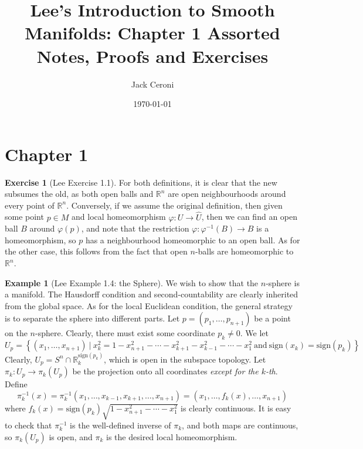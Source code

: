 \documentclass[aps,pra,showpacs,notitlepage,onecolumn,superscriptaddress,nofootinbib]{revtex4-1}
\theoremstyle{definition}
\newtheorem{example}{Example}[section]
\newtheorem{exercise}{Exercise}[section]
\begin{document}
\title{Lee's Introduction to Smooth Manifolds: Chapter 1 Assorted Notes, Proofs and Exercises}

\author{Jack Ceroni}

\date{\today}

\maketitle


\section{Chapter 1}

\begin{exercise}[Lee Exercise 1.1]
  For both definitions, it is clear that the new subsumes the old, as both open balls and $\mathbb{R}^{n}$ are open neighbourhoods around every point of $\mathbb{R}^{n}$.
Conversely, if we assume the original definition, then given some point $p \in M$ and local homeomorphism $\varphi : U \rightarrow \widehat{U}$, then we can find an open ball
$B$ around $\varphi(p)$, and note that the restriction $\varphi : \varphi^{-1}(B) \rightarrow B$ is a homeomorphism, so $p$ has a neighbourhood homeomorphic to an open ball.
As for the other case, this follows from the fact that open $n$-balls are homeomorphic to $\mathbb{R}^{n}$.
\end{exercise}

\begin{example}[Lee Example 1.4: the Sphere]
We wish to show that the $n$-sphere is a manifold. The Hausdorff condition and second-countability are clearly inherited from the global space. As for the local Euclidean condition,
the general strategy is to separate the sphere into different parts. Let $p = (p_1, \dots, p_{n + 1})$ be a point on the $n$-sphere. Clearly, there must exist some coordinate $p_k \neq 0$. We let
\begin{equation}
  U_p = \left\{ (x_1, \dots, x_{n + 1}) \ | \ x_{k}^2 = 1 - x_{n + 1}^2 - \cdots - x_{k + 1}^2 - x_{k - 1}^2 - \cdots - x_1^2 \ \text{and} \ \text{sign}(x_k) = \text{sign}(p_k) \right\}
  \end{equation}
Clearly, $U_p = S^{n} \cap \mathbb{R}_k^{\text{sign}(p_k)}$, which is open in the subspace topology. Let $\pi_k : U_p \rightarrow \pi_k(U_p)$ be the projection onto all coordinates \textit{except for the $k$-th}.
Define
\begin{equation}
  \pi_k^{-1}(x) = \pi_k^{-1}(x_1, \dots, x_{k - 1}, x_{k + 1}, \dots, x_{n + 1}) = (x_1, \dots, f_k(x), \dots, x_{n + 1})
\end{equation}
where $f_k(x) = \text{sign}(p_k) \sqrt{1 - x_{n + 1}^2 - \cdots - x_1^{2}}$ is clearly continuous. It is easy to check that $\pi_k^{-1}$ is the well-defined inverse of $\pi_k$, and both maps are continuous,
so $\pi_k(U_p)$ is open, and $\pi_k$ is the desired local homeomorphism.
\end{example}
\end{document}
